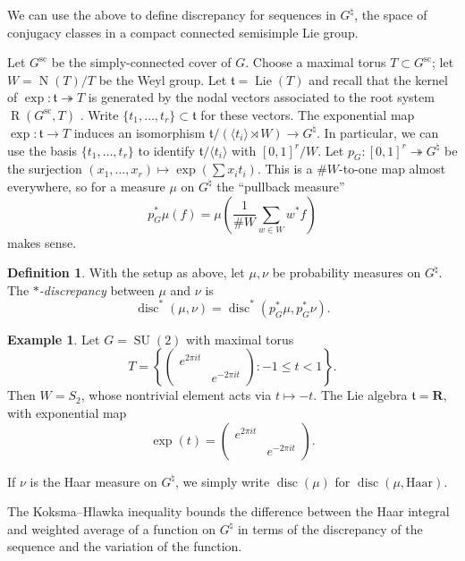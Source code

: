\documentclass{article}
\DeclareMathOperator{\disc}{disc}
\DeclareMathOperator{\Lie}{Lie}
\DeclareMathOperator{\N}{N}
\DeclareMathOperator{\R}{R}
\DeclareMathOperator{\SU}{SU}
\newcommand{\bR}{\mathbf{R}}
\newcommand{\ft}{\mathfrak{t}}
\newcommand{\Haar}{\mathrm{Haar}}
\newcommand{\simplc}{\mathrm{sc}}
\theoremstyle{definition}
\newtheorem{definition}[subsection]{Definition}
\newtheorem{example}[subsection]{Example}
\begin{document}
We can use the above to define discrepancy for sequences in $G^\natural$, the 
space of conjugacy classes in a compact connected semisimple Lie group.

Let $G^\simplc$ be the simply-connected cover of $G$. Choose a maximal torus 
$T\subset G^\simplc$; let $W=\N(T)/T$ be the Weyl group. Let $\ft=\Lie(T)$ and 
recall that the kernel of $\exp\colon \ft\twoheadrightarrow T$ is generated by 
the nodal vectors associated to the root system $\R(G^\simplc,T)$ 
\cite[9.6 Pr.11]{bourbaki-lie-alg-7-9}. Write $\{t_1,\dots,t_r\}\subset \ft$ 
for these vectors. The exponential map $\exp\colon \ft\to T$ induces an 
isomorphism $\ft/(\langle t_i\rangle \rtimes W) \to G^\natural$. In particular, 
we can use the basis $\{t_1,\dots,t_r\}$ to identify $\ft/\langle t_i\rangle$ 
with $[0,1]^r/W$. Let $p_G\colon [0,1]^r \twoheadrightarrow G^\natural$ be the 
surjection $(x_1,\dots,x_r)\mapsto \exp(\sum x_i t_i)$. This is a $\# W$-to-one 
map almost everywhere, so for a measure $\mu$ on $G^\natural$ the ``pullback 
measure'' 
\[
	p_G^\ast \mu(f) = \mu\left(\frac{1}{\# W} \sum_{w\in W} w^\ast f\right)
\]
makes sense. 

\begin{definition}
With the setup as above, let $\mu,\nu$ be probability measures on $G^\natural$. 
The \emph{$\ast$-discrepancy} between $\mu$ and $\nu$ is
\[
	\disc^\ast(\mu,\nu) = \disc^\ast(p_G^\ast \mu,p_G^\ast \nu).
\]
\end{definition}

\begin{example}
Let $G=\SU(2)$ with maximal torus 
\[
	T = \left\{ \begin{pmatrix} e^{2\pi i t} \\ & e^{-2\pi i t} \end{pmatrix} : -1\leqslant t <1\right\} .
\]
Then $W=S_2$, whose nontrivial element acts via $t\mapsto -t$. The Lie algebra 
$\ft=\bR$, with exponential map 
\[
	\exp(t) = \begin{pmatrix} e^{2\pi i t} \\ & e^{-2\pi i t} \end{pmatrix} .
\]
\end{example}

If $\nu$ is the Haar measure on $G^\natural$, we simply write 
$\disc(\mu)$ for $\disc(\mu,\Haar)$. 

The Koksma--Hlawka inequality bounds the difference between the Haar integral 
and weighted average of a function on $G^\natural$ in terms of the discrepancy 
of the sequence and the variation of the function. 
\end{document}
